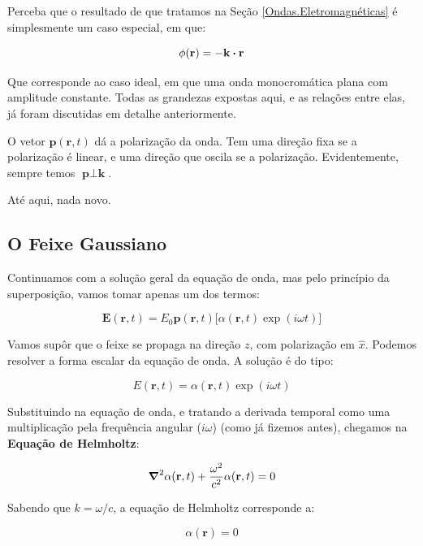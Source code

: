 \documentclass[12pt,a4paper]{report}
\begin{document}
Perceba que o resultado de que tratamos na Seção \ref{Ondas.Eletromagnéticas} é simplesmente um caso especial, em que:

\begin{equation*}
    \phi(\textbf{r})=-\textbf{k}\vdot\textbf{r}
\end{equation*}

Que corresponde ao caso ideal, em que uma onda monocromática plana com amplitude constante. Todas as grandezas expostas aqui, e as relações entre elas, já foram discutidas em detalhe anteriormente.

O vetor $\textbf{p}(\textbf{r},t)$ dá a polarização da onda. Tem uma direção fixa se a polarização é linear, e uma direção que oscila se a polarização. Evidentemente, sempre temos $\textbf{p}\perp\textbf{k}$.

Até aqui, nada novo.

\subsection{O Feixe Gaussiano}

Continuamos com a solução geral da equação de onda, mas pelo princípio da superposição, vamos tomar apenas um dos termos:

\begin{equation}
    \textbf{E}(\textbf{r},t)=E_0\textbf{p}(\textbf{r},t)\bigl[\alpha(\textbf{r},t)\exp(i\omega t)\bigr]
\end{equation}

Vamos supôr que o feixe se propaga na direção $z$, com polarização em $\hat{x}$. Podemos resolver a forma escalar da equação de onda. A solução é do tipo:

\begin{equation}
    E(\textbf{r},t)=\alpha(\textbf{r},t)\exp(i\omega t)
\end{equation}

Substituindo na equação de onda, e tratando a derivada temporal como uma multiplicação pela frequência angular ($i\omega$) (como já fizemos antes), chegamos na \textbf{Equação de Helmholtz}:

\begin{equation}
  \grad^2{\alpha(\textbf{r},t)}+\frac{\omega^2}{c^2}\alpha(\textbf{r},t)=0
\end{equation}

Sabendo que $k=\omega/c$, a equação de Helmholtz corresponde a:

\begin{equation}
    [\grad^2+k^2]\alpha(\textbf{r})=0
\end{equation}
\end{document}
